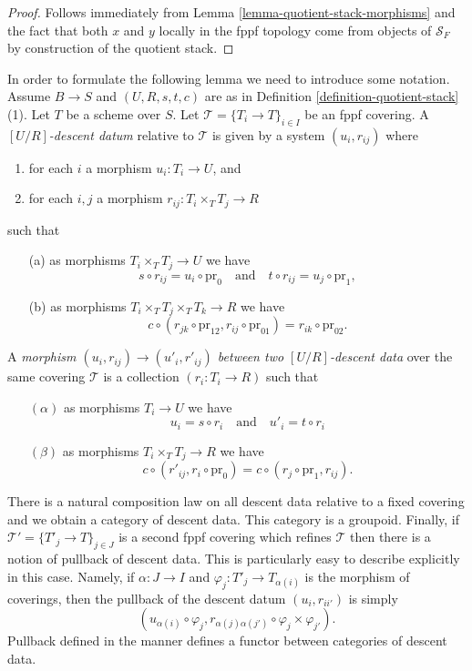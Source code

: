 \begin{proof}
Follows immediately from
Lemma \ref{lemma-quotient-stack-morphisms}
and the fact that both $x$ and $y$ locally in the fppf
topology come from objects of $\mathcal{S}_F$ by construction
of the quotient stack.
\end{proof}

\noindent
In order to formulate the following lemma we need to introduce some
notation. Assume $B \to S$ and $(U, R, s, t, c)$ are as in
Definition \ref{definition-quotient-stack} (1).
Let $T$ be a scheme over $S$. Let $\mathcal{T} = \{T_i \to T\}_{i \in I}$
be an fppf covering. A {\it $[U/R]$-descent datum} relative
to $\mathcal{T}$ is given by a system $(u_i, r_{ij})$ where
\begin{enumerate}
\item for each $i$ a morphism $u_i : T_i \to U$, and
\item for each $i, j$ a morphism $r_{ij} : T_i \times_T T_j \to R$
\end{enumerate}
such that
\begin{enumerate}
\item[(a)] as morphisms $T_i \times_T T_j \to U$ we have
$$
s \circ r_{ij} = u_i \circ \text{pr}_0
\quad\text{and}\quad
t \circ r_{ij} = u_j \circ \text{pr}_1,
$$
\item[(b)] as morphisms $T_i \times_T T_j \times_T T_k \to R$ we have
$$
c \circ (r_{jk} \circ \text{pr}_{12}, r_{ij} \circ \text{pr}_{01})
= r_{ik} \circ \text{pr}_{02}.
$$
\end{enumerate}
A {\it morphism $(u_i, r_{ij}) \to (u'_i, r'_{ij})$ between two
$[U/R]$-descent data} over the same covering $\mathcal{T}$
is a collection $(r_i : T_i \to R)$ such that
\begin{enumerate}
\item[$(\alpha)$] as morphisms $T_i \to U$ we have
$$
u_i = s \circ r_i
\quad\text{and}\quad
u'_i = t \circ r_i
$$
\item[$(\beta)$] as morphisms $T_i \times_T T_j \to R$ we have
$$
c \circ (r'_{ij}, r_i \circ \text{pr}_0)
=
c \circ (r_j \circ \text{pr}_1, r_{ij}).
$$
\end{enumerate}
There is a natural composition law on all descent data relative
to a fixed covering and we obtain a category of descent data.
This category is a groupoid. Finally, if
$\mathcal{T}' = \{T'_j \to T\}_{j \in J}$
is a second fppf covering which refines $\mathcal{T}$ then there
is a notion of pullback of descent data. This is particularly easy to
describe explicitly in this case. Namely, if $\alpha : J \to I$ and
$\varphi_j : T'_j \to T_{\alpha(i)}$ is the morphism of coverings, then
the pullback of the descent datum $(u_i, r_{ii'})$ is simply
$$
(u_{\alpha(i)} \circ \varphi_j,
r_{\alpha(j)\alpha(j')} \circ \varphi_j \times \varphi_{j'}).
$$
Pullback defined in the manner defines a functor between categories of
descent data.

